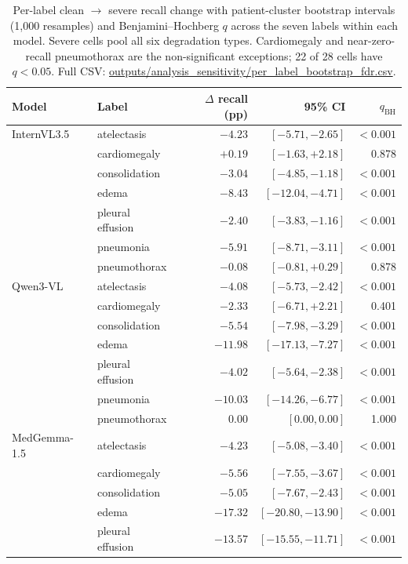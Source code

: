 \begin{table}[H]
\centering
\footnotesize
\setlength{\tabcolsep}{3pt}
\caption{Per-label clean $\rightarrow$ severe recall change with patient-cluster bootstrap intervals (1,000 resamples) and Benjamini--Hochberg $q$ across the seven labels within each model. Severe cells pool all six degradation types. Cardiomegaly and near-zero-recall pneumothorax are the non-significant exceptions; 22 of 28 cells have $q<0.05$. Full CSV: \url{outputs/analysis_sensitivity/per_label_bootstrap_fdr.csv}.}
\label{tab:perlabel}
\begin{tabular}{llrrr}
\toprule
Model & Label & $\Delta$ recall (pp) & 95\% CI & $q_{\mathrm{BH}}$ \\
\midrule
InternVL3.5 & atelectasis & $-4.23$ & $[-5.71,-2.65]$ & $<0.001$ \\
 & cardiomegaly & $+0.19$ & $[-1.63,+2.18]$ & 0.878 \\
 & consolidation & $-3.04$ & $[-4.85,-1.18]$ & $<0.001$ \\
 & edema & $-8.43$ & $[-12.04,-4.71]$ & $<0.001$ \\
 & pleural effusion & $-2.40$ & $[-3.83,-1.16]$ & $<0.001$ \\
 & pneumonia & $-5.91$ & $[-8.71,-3.11]$ & $<0.001$ \\
 & pneumothorax & $-0.08$ & $[-0.81,+0.29]$ & 0.878 \\
\midrule
Qwen3-VL & atelectasis & $-4.08$ & $[-5.73,-2.42]$ & $<0.001$ \\
 & cardiomegaly & $-2.33$ & $[-6.71,+2.21]$ & 0.401 \\
 & consolidation & $-5.54$ & $[-7.98,-3.29]$ & $<0.001$ \\
 & edema & $-11.98$ & $[-17.13,-7.27]$ & $<0.001$ \\
 & pleural effusion & $-4.02$ & $[-5.64,-2.38]$ & $<0.001$ \\
 & pneumonia & $-10.03$ & $[-14.26,-6.77]$ & $<0.001$ \\
 & pneumothorax & $0.00$ & $[0.00,0.00]$ & 1.000 \\
\midrule
MedGemma-1.5 & atelectasis & $-4.23$ & $[-5.08,-3.40]$ & $<0.001$ \\
 & cardiomegaly & $-5.56$ & $[-7.55,-3.67]$ & $<0.001$ \\
 & consolidation & $-5.05$ & $[-7.67,-2.43]$ & $<0.001$ \\
 & edema & $-17.32$ & $[-20.80,-13.90]$ & $<0.001$ \\
 & pleural effusion & $-13.57$ & $[-15.55,-11.71]$ & $<0.001$ \\

\end{tabular}
\end{table}
